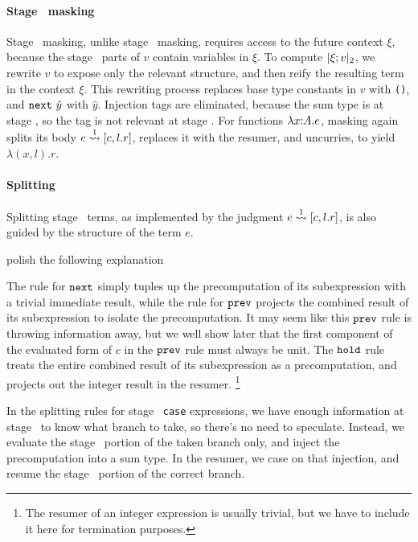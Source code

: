 \paragraph{Stage \bbtwo\ masking}

Stage \bbtwo\ masking, unlike stage \bbone\ masking, requires access to the
future context $\xi$, because the stage \bbtwo\ parts of $v$ contain variables
in $\xi$. To compute $|\xi;v|_{ 2}$, we rewrite $v$ to expose only the relevant
structure, and then reify the resulting term in the context $\xi$. This
rewriting process replaces base type constants in $v$ with \texttt{()}, and
${\tt next}~\hat{y}$ with $\hat{y}$. Injection tags are eliminated, because the sum
type is at stage \bbone, so the tag is not relevant at stage \bbtwo. For
functions $\lambda{x}\mathrm{:}{A}.{e}$, masking again splits its body $e\overset{ 1}\rightsquigarrow [c,l.r]$,
replaces it with the resumer, and uncurries, to yield $\lambda (x,l).r$.

\paragraph{Splitting}

Splitting stage \bbone\ terms, as implemented by the judgment $e\overset{ 1}\rightsquigarrow
[c,l.r]$, is also guided by the structure of the term $e$.

\TODO polish the following explanation

The rule for ${\tt next}$ simply tuples up the precomputation of its subexpression with a trivial immediate result,
while the rule for ${\tt prev}$ projects the combined result of its subexpression to isolate the precomputation.
It may seem like this ${\tt prev}$ rule is throwing information away, but we well show later that the first component 
of the evaluated form of $c$ in the ${\tt prev}$ rule must always be unit.
The ${\tt hold}$ rule treats the entire combined result of its subexpression as a precomputation, 
and projects out the integer result in the resumer.%
\footnote{The resumer of an integer expression is usually trivial, 
but we have to include it here for termination purposes.}

In the splitting rules for stage \bbone\ {\tt case} expressions, we
have enough information at stage \bbone\ to know what branch to take, so there's
no need to speculate. Instead, we evaluate the stage \bbone\ portion of the
taken branch only, and inject the precomputation into a sum type. In the
resumer, we case on that injection, and resume the stage \bbtwo\ portion of the
correct branch.


